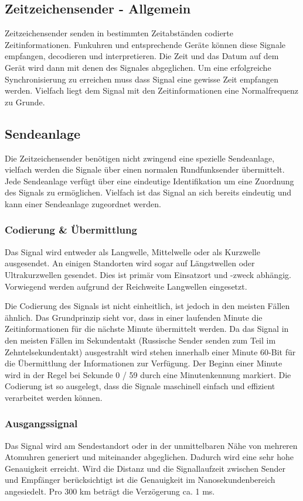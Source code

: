 \subsection{Zeitzeichensender - Allgemein}

Zeitzeichensender senden in bestimmten Zeitabständen codierte Zeitinformationen. Funkuhren und entsprechende Geräte können diese Signale empfangen, decodieren und interpretieren. Die Zeit und das Datum auf dem Gerät wird dann mit denen des Signales abgeglichen. Um eine erfolgreiche Synchronisierung zu erreichen muss dass Signal eine gewisse Zeit empfangen werden. Vielfach liegt dem Signal mit den Zeitinformationen eine Normalfrequenz zu Grunde.

\subsection{Sendeanlage}
Die Zeitzeichensender benötigen nicht zwingend eine spezielle Sendeanlage, vielfach werden die Signale über einen normalen Rundfunksender übermittelt. Jede Sendeanlage verfügt über eine eindeutige Identifikation um eine Zuordnung des Signals zu ermöglichen. Vielfach ist das Signal an sich bereits eindeutig und kann einer Sendeanlage zugeordnet werden.

\subsubsection{Codierung \& Übermittlung}
Das Signal wird entweder als Langwelle, Mittelwelle oder als Kurzwelle ausgesendet. An einigen Standorten wird sogar auf Längstwellen oder Ultrakurzwellen gesendet. Dies ist primär vom Einsatzort und -zweck abhängig. Vorwiegend werden aufgrund der Reichweite Langwellen eingesetzt.

Die Codierung des Signals ist nicht einheitlich, ist jedoch in den meisten Fällen ähnlich. Das Grundprinzip sieht vor, dass in einer laufenden Minute die Zeitinformationen für die nächste Minute übermittelt werden. Da das Signal in den meisten Fällen im Sekundentakt (Russische Sender senden zum Teil im Zehntelsekundentakt) ausgestrahlt wird stehen innerhalb einer Minute 60-Bit für die Übermittlung der Informationen zur Verfügung. Der Beginn einer Minute wird in der Regel bei Sekunde 0 / 59 durch eine Minutenkennung markiert. Die Codierung ist so ausgelegt, dass die Signale maschinell einfach und effizient verarbeitet werden können.

\subsubsection{Ausgangssignal}
Das Signal wird am Sendestandort oder in der unmittelbaren Nähe von mehreren Atomuhren generiert und miteinander abgeglichen. Dadurch wird eine sehr hohe Genauigkeit erreicht. Wird die Distanz und die Signallaufzeit zwischen Sender und Empfänger berücksichtigt ist die Genauigkeit im Nanosekundenbereich angesiedelt. Pro 300 km beträgt die Verzögerung ca. 1 ms.

